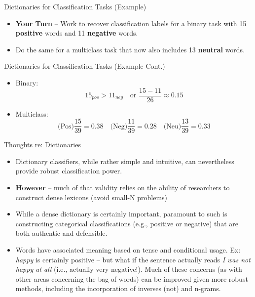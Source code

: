 \documentclass[
  ignorenonframetext,
  aspectratio=169]{beamer}
\begin{document}
\begin{frame}{Dictionaries for Classification Tasks (Example)}
\label{dictionaries-for-classification-tasks-example}
\begin{itemize}
\item \textbf{Your Turn} -- Work to recover classification labels for a binary task with 15 \textbf{positive} words and 11 \textbf{negative} words. 
\item Do the same for a multiclass task that now also includes 13 \textbf{neutral} words. 
\end{itemize}
\end{frame}

\begin{frame}{Dictionaries for Classification Tasks (Example Cont.)}
\label{dictionaries-for-classification-tasks-example-cont.}
\begin{itemize}
\item Binary: $$15_{pos}>11_{neg} \quad \text{or } \frac{15-11}{26}\approx0.15$$ \par \vspace{5mm}
\item Multiclass: $$\text{(Pos)}\frac{15}{39}=0.38 \quad \text{(Neg)}\frac{11}{39}=0.28 \quad \text{(Neu)}\frac{13}{39}=0.33  $$
\end{itemize}
\end{frame}

\begin{frame}{Thoughts re: Dictionaries}
\label{thoughts-re-dictionaries}
\begin{itemize}
\item Dictionary classifiers, while rather simple and intuitive, can nevertheless provide robust classification power. \par \vspace{2.5mm} \pause
\item \textbf{However} -- much of that validity relies on the ability of researchers to construct dense lexicons (avoid small-N problems)  \par \vspace{2.5mm} \pause
\item While a dense dictionary is certainly important, paramount to such is constructing categorical classifications (e.g., positive or negative) that are both authentic and defensible.   \par \vspace{2.5mm} \pause
\item Words have associated meaning based on tense and conditional usage. Ex: \textit{happy} is certainly positive – but what if the sentence actually reads \textit{I was not happy at all} (i.e., actually very negative!). Much of these concerns (as with other areas concerning the bag of words) can be improved given more robust methods, including the incorporation of inverses (not) and n-grams.
\end{itemize}
\end{frame}
\end{document}
